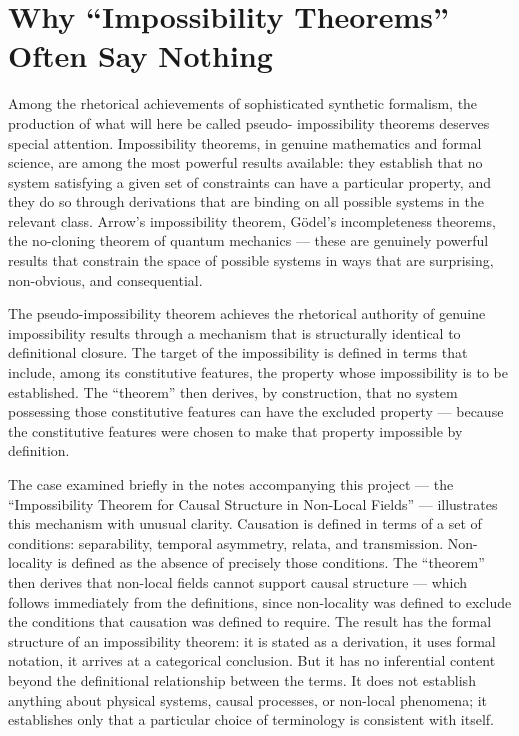 \documentclass[12pt, openright, twoside]{book}
\begin{document}
\section{Why ``Impossibility Theorems'' Often Say Nothing}

Among the rhetorical achievements of sophisticated synthetic
formalism, the production of what will here be called pseudo-
impossibility theorems deserves special attention. Impossibility
theorems, in genuine mathematics and formal science, are among
the most powerful results available: they establish that no
system satisfying a given set of constraints can have a
particular property, and they do so through derivations that
are binding on all possible systems in the relevant class.
Arrow's impossibility theorem, Gödel's incompleteness theorems,
the no-cloning theorem of quantum mechanics --- these are
genuinely powerful results that constrain the space of possible
systems in ways that are surprising, non-obvious, and
consequential.

The pseudo-impossibility theorem achieves the rhetorical
authority of genuine impossibility results through a mechanism
that is structurally identical to definitional closure. The
target of the impossibility is defined in terms that include,
among its constitutive features, the property whose impossibility
is to be established. The ``theorem'' then derives, by
construction, that no system possessing those constitutive
features can have the excluded property --- because the
constitutive features were chosen to make that property
impossible by definition.

The case examined briefly in the notes accompanying this
project --- the ``Impossibility Theorem for Causal Structure
in Non-Local Fields'' --- illustrates this mechanism with
unusual clarity. Causation is defined in terms of a set of
conditions: separability, temporal asymmetry, relata, and
transmission. Non-locality is defined as the absence of
precisely those conditions. The ``theorem'' then derives
that non-local fields cannot support causal structure ---
which follows immediately from the definitions, since
non-locality was defined to exclude the conditions that
causation was defined to require. The result has the formal
structure of an impossibility theorem: it is stated as a
derivation, it uses formal notation, it arrives at a
categorical conclusion. But it has no inferential content
beyond the definitional relationship between the terms.
It does not establish anything about physical systems,
causal processes, or non-local phenomena; it establishes
only that a particular choice of terminology is consistent
with itself.
\end{document}

